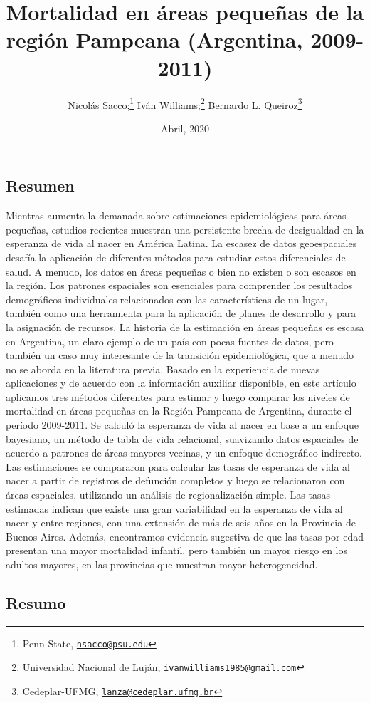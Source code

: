 \documentclass[12pt,]{article}
\title{Mortalidad en áreas pequeñas de la región Pampeana (Argentina,
2009-2011)}
\author{Nicolás Sacco;\footnote{Penn State,
  \href{mailto:nsacco@psu.edu}{\nolinkurl{nsacco@psu.edu}}} Iván
Williams;\footnote{Universidad Nacional de Luján,
  \href{mailto:ivanwilliams1985@gmail.com}{\nolinkurl{ivanwilliams1985@gmail.com}}}
Bernardo L. Queiroz\footnote{Cedeplar-UFMG,
  \href{mailto:lanza@cedeplar.ufmg.br}{\nolinkurl{lanza@cedeplar.ufmg.br}}}}
\date{Abril, 2020}
\begin{document}
\maketitle

\hypertarget{resumen}{%
\subsection{\texorpdfstring{\textbf{Resumen}}{Resumen}}\label{resumen}}

Mientras aumenta la demanada sobre estimaciones epidemiológicas para
áreas pequeñas, estudios recientes muestran una persistente brecha de
desigualdad en la esperanza de vida al nacer en América Latina. La
escasez de datos geoespaciales desafía la aplicación de diferentes
métodos para estudiar estos diferenciales de salud. A menudo, los datos
en áreas pequeñas o bien no existen o son escasos en la región. Los
patrones espaciales son esenciales para comprender los resultados
demográficos individuales relacionados con las características de un
lugar, también como una herramienta para la aplicación de planes de
desarrollo y para la asignación de recursos. La historia de la
estimación en áreas pequeñas es escasa en Argentina, un claro ejemplo de
un país con pocas fuentes de datos, pero también un caso muy interesante
de la transición epidemiológica, que a menudo no se aborda en la
literatura previa. Basado en la experiencia de nuevas aplicaciones y de
acuerdo con la información auxiliar disponible, en este artículo
aplicamos tres métodos diferentes para estimar y luego comparar los
niveles de mortalidad en áreas pequeñas en la Región Pampeana de
Argentina, durante el período 2009-2011. Se calculó la esperanza de vida
al nacer en base a un enfoque bayesiano, un método de tabla de vida
relacional, suavizando datos espaciales de acuerdo a patrones de áreas
mayores vecinas, y un enfoque demográfico indirecto. Las estimaciones se
compararon para calcular las tasas de esperanza de vida al nacer a
partir de registros de defunción completos y luego se relacionaron con
áreas espaciales, utilizando un análisis de regionalización simple. Las
tasas estimadas indican que existe una gran variabilidad en la esperanza
de vida al nacer y entre regiones, con una extensión de más de seis años
en la Provincia de Buenos Aires. Además, encontramos evidencia sugestiva
de que las tasas por edad presentan una mayor mortalidad infantil, pero
también un mayor riesgo en los adultos mayores, en las provincias que
muestran mayor heterogeneidad.

\hypertarget{resumo}{%
\subsection{\texorpdfstring{\textbf{Resumo}}{Resumo}}\label{resumo}}
\end{document}
